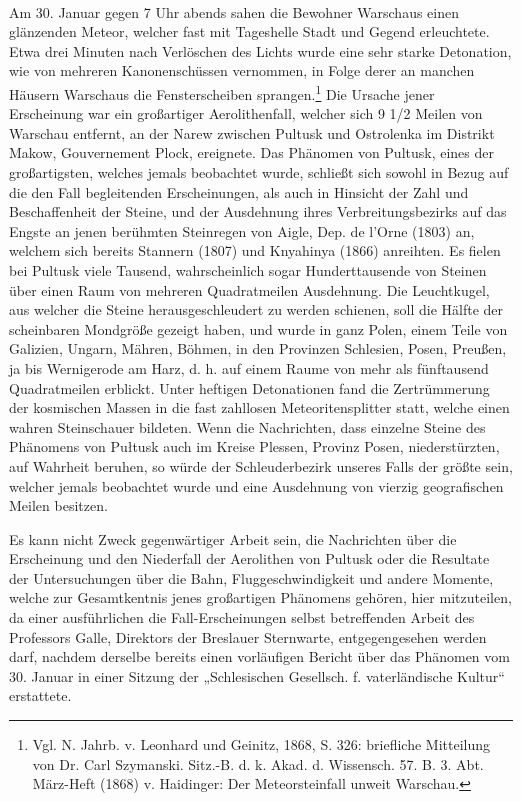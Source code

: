 \documentclass[a4paper, 11pt, oneside, german]{article}
\begin{document}
\paragraph{}
Am 30. Januar gegen 7 Uhr abends sahen die Bewohner Warschaus einen glänzenden Meteor, welcher fast mit Tageshelle Stadt und Gegend erleuchtete. Etwa drei Minuten nach Verlöschen des Lichts wurde eine sehr starke Detonation, wie von mehreren Kanonenschüssen vernommen, in Folge derer an manchen Häusern Warschaus die Fensterscheiben sprangen.\footnote{Vgl. N. Jahrb. v. Leonhard und Geinitz, 1868, S. 326: briefliche Mitteilung von Dr. Carl Szymanski. Sitz.-B. d. k. Akad. d. Wissensch. 57. B. 3. Abt. März-Heft (1868) v. Haidinger: Der Meteorsteinfall unweit Warschau.} Die Ursache jener Erscheinung war ein großartiger Aerolithenfall, welcher sich 9 1/2 Meilen von Warschau entfernt, an der Narew zwischen Pultusk und Ostrolenka im Distrikt Makow, Gouvernement Plock, ereignete. Das Phänomen von Pultusk, eines der großartigsten, welches jemals beobachtet wurde, schließt sich sowohl in Bezug auf die den Fall begleitenden Erscheinungen, als auch in Hinsicht der Zahl und Beschaffenheit der Steine, und der Ausdehnung ihres Verbreitungsbezirks auf das Engste an jenen berühmten Steinregen von Aigle, Dep. de l'Orne (1803) an, welchem sich bereits Stannern (1807) und Knyahinya (1866) anreihten. Es fielen bei Pultusk viele Tausend, wahrscheinlich sogar Hunderttausende von Steinen über einen Raum von mehreren Quadratmeilen Ausdehnung. Die Leuchtkugel, aus welcher die Steine herausgeschleudert zu werden schienen, soll die Hälfte der scheinbaren Mondgröße gezeigt haben, und wurde in ganz Polen, einem Teile von Galizien, Ungarn, Mähren, Böhmen, in den Provinzen Schlesien, Posen, Preußen, ja bis Wernigerode am Harz, d. h. auf einem Raume von mehr als fünftausend Quadratmeilen erblickt. Unter heftigen Detonationen fand die Zertrümmerung der kosmischen Massen in die fast zahllosen Meteoritensplitter statt, welche einen wahren Steinschauer bildeten. Wenn die Nachrichten, dass einzelne Steine des Phänomens von Pułtusk auch im Kreise Plessen, Provinz Posen, niederstürzten, auf Wahrheit beruhen, so würde der Schleuderbezirk unseres Falls der größte sein, welcher jemals beobachtet wurde und eine Ausdehnung von vierzig geografischen Meilen besitzen.

Es kann nicht Zweck gegenwärtiger Arbeit sein, die Nachrichten über die Erscheinung und den Niederfall der Aerolithen von Pultusk oder die Resultate der Untersuchungen über die Bahn, Fluggeschwindigkeit und andere Momente, welche zur Gesamtkentnis jenes großartigen Phänomens gehören, hier mitzuteilen, da einer ausführlichen die Fall-Erscheinungen selbst betreffenden Arbeit des Professors Galle, Direktors der Breslauer Sternwarte, entgegengesehen werden darf, nachdem derselbe bereits einen vorläufigen Bericht über das Phänomen vom 30. Januar in einer Sitzung der „Schlesischen Gesellsch. f. vaterländische Kultur“ erstattete.
\end{document}
